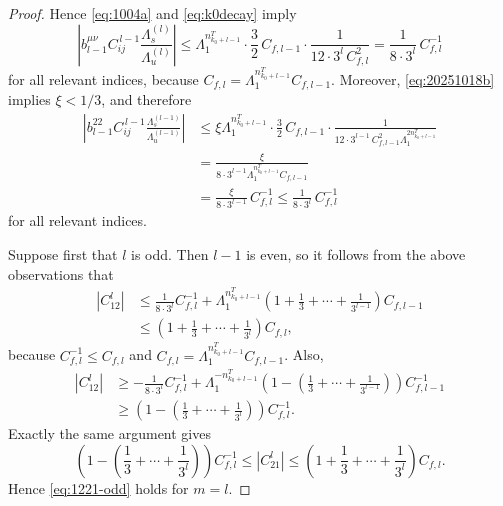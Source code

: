 \documentclass[10pt,a4paper]{amsart}
\begin{document}
\begin{proof}
Hence \eqref{eq:1004a} and \eqref{eq:k0decay} imply
\[
\left|b_{l-1}^{\mu\nu}C_{ij}^{\,l-1}\frac{\Lambda_s^{(l)}}{\Lambda_u^{(l)}}\right|
\le
\Lambda_1^{n_{k_0+l-1}^T}\cdot \frac32\,C_{f,l-1}\cdot
\frac{1}{12\cdot 3^l\,C_{f,l}^2}
=
\frac{1}{8\cdot 3^l}\,C_{f,l}^{-1}
\]
for all relevant indices, because
$
C_{f,l}=\Lambda_1^{n_{k_0+l-1}^T}C_{f,l-1}.
$
Moreover, \eqref{eq:20251018b} implies $\xi<1/3$, and therefore
\begin{align*}
\left|b_{l-1}^{22}C_{ij}^{\,l-1}\frac{\Lambda_s^{(l-1)}}{\Lambda_u^{(l-1)}}\right|
&\le
\xi\Lambda_1^{n_{k_0+l-1}^T}\cdot \frac32\,C_{f,l-1}\cdot
\frac{1}{12\cdot 3^{l-1}\,C_{f,l-1}^2\Lambda_1^{2n_{k_0+l-1}^T}}\\
&=
\frac{\xi}{8\cdot 3^{l-1}\Lambda_1^{n_{k_0+l-1}^T}C_{f,l-1}}\\
&=
\frac{\xi}{8\cdot 3^{l-1}}\,C_{f,l}^{-1}
\le
\frac{1}{8\cdot 3^l}\,C_{f,l}^{-1}
\end{align*}
for all relevant indices.

Suppose first that $l$ is odd. Then $l-1$ is even, so it follows from the above observations that
\begin{align*}
|C_{12}^{l}|
&\le
\frac{1}{8\cdot 3^l}C_{f,l}^{-1}
+\Lambda_1^{n_{k_0+l-1}^T}
\left(1+\frac{1}{3}+\cdots +\frac{1}{3^{l-1}}\right)C_{f,l-1}\\
&\le
\left(1+\frac{1}{3}+\cdots +\frac{1}{3^{l}}\right)C_{f,l},
\end{align*}
because $C_{f,l}^{-1}\le C_{f,l}$ and $C_{f,l}=\Lambda_1^{n_{k_0+l-1}^T}C_{f,l-1}$. Also,
\begin{align*}
|C_{12}^{l}|
&\ge
-\frac{1}{8\cdot 3^l}C_{f,l}^{-1}
+\Lambda_1^{-n_{k_0+l-1}^T}
\left(1-\left(\frac{1}{3}+\cdots +\frac{1}{3^{l-1}}\right)\right)C_{f,l-1}^{-1}\\
&\ge
\left(1-\left(\frac{1}{3}+\cdots +\frac{1}{3^{l}}\right)\right)C_{f,l}^{-1}.
\end{align*}
Exactly the same argument gives
\[
\left(1-\left(\frac{1}{3}+\cdots +\frac{1}{3^{l}}\right)\right)C_{f,l}^{-1}
\le |C_{21}^{l}|
\le
\left(1+\frac{1}{3}+\cdots +\frac{1}{3^{l}}\right)C_{f,l}.
\]
Hence \eqref{eq:1221-odd} holds for $m=l$.


\end{proof}
\end{document}
